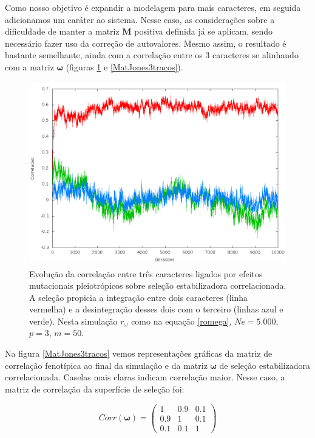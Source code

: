 Como nosso objetivo é expandir a modelagem para mais caracteres, em seguida
adicionamos um caráter ao sistema. 
Nesse caso, as considerações sobre a dificuldade de manter a matriz
$\mathbf{M}$
positiva definida já se aplicam, sendo necessário fazer uso da correção
de autovalores. 
Mesmo assim, o resultado é bastante semelhante, ainda com a correlação
entre os 3 caracteres se alinhando com a matriz $\pmb{\omega}$ (figuras
\ref{jones3tracos} e \ref{MatJones3tracos}). 

\begin{figure}[htbp]
    \centering
    \includegraphics[width=150mm, height=80mm]{figuras/jones3tracos.png}
    \caption{Evolução da correlação entre três caracteres ligados por efeitos
        mutacionais pleiotrópicos sobre seleção estabilizadora correlacionada.
        A seleção propicia a integração entre dois caracteres (linha vermelha) e a desintegração
        desses dois com o terceiro (linhas azul e verde). Nesta simulação
        $r_\omega$ como na equação \ref{romega}, $Ne=5.000$, $p=3$, $m=50$.}
    \label{jones3tracos}
\end{figure}

Na figura \ref{MatJones3tracos} vemos representações gráficas da matriz
de correlação fenotípica ao final da simulação e da matriz $\pmb{\omega}$ de
seleção estabilizadora correlacionada. 
Caselas mais claras indicam correlação maior. 
Nesse caso, a matriz de correlação da superfície de seleção foi:

\begin{equation}
    Corr(\pmb{\omega}) = \left( \begin{smallmatrix} 1 & 0.9 & 0.1\\  0.9 & 1 & 0.1 \\ 0.1 & 0.1 & 1 \end{smallmatrix}  \right)
    \label{romega}
\end{equation}

